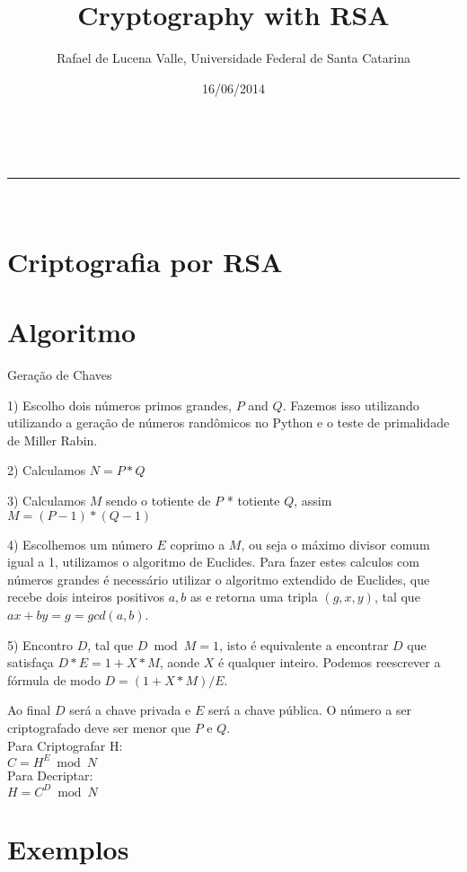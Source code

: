 \documentclass[a4paper,11pt]{article}
\makeatletter
\newcommand{\linia}{\rule{\linewidth}{0.5pt}}
\theoremstyle{mytheor}
\renewcommand{\maketitle}{
\begin{center}
\vspace{2ex}
{\huge \textsc{\@title}}
\vspace{1ex}
\\
\linia\\
\@author \hfill \@date
\vspace{4ex}
\end{center}
}
\makeatother
\begin{document}
\title{Cryptography with RSA}

\author{Rafael de Lucena Valle, Universidade Federal de Santa Catarina}

\date{16/06/2014}

\maketitle

\section*{Criptografia por RSA}

\section*{Algoritmo}

Geração de Chaves

1) Escolho dois números primos grandes, $P$ and $Q$.
Fazemos isso utilizando utilizando a geração de números randômicos no Python e o teste de primalidade de Miller Rabin.

2) Calculamos $N = P*Q$

3) Calculamos $M$ sendo o totiente de $P$ * totiente $Q$, assim $M = (P - 1)*(Q - 1)$

4) Escolhemos um número $E$ coprimo a $M$, ou seja o máximo divisor comum igual a 1, utilizamos o algoritmo de Euclides. Para fazer estes calculos com números grandes é necessário utilizar o algoritmo extendido de Euclides, que recebe dois inteiros positivos $a, b$ as e retorna uma tripla $(g, x, y)$, tal que $ax + by = g = gcd(a, b)$.

5) Encontro $D$, tal que $D \bmod M = 1$, isto é equivalente a encontrar $D$ que satisfaça $D*E = 1 + X*M$, aonde $X$ é qualquer inteiro. Podemos reescrever a fórmula de modo $D = (1 + X*M) / E$.

Ao final $D$ será a chave privada e $E$ será a chave pública. O número a ser criptografado deve ser menor que $P$ e $Q$.\\

Para Criptografar H:\\
$C = H^E \bmod N$\\

Para Decriptar:\\
$H = C^D \bmod N$

\section*{Exemplos}
\end{document}
